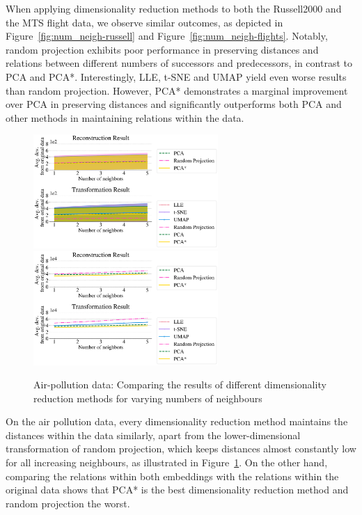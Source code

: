 \documentclass[pdftex,12pt,a4paper]{report}
\begin{document}
When applying dimensionality reduction methods to both the Russell2000 and the MTS flight data, we observe similar outcomes, as depicted in Figure~\ref{fig:num_neigh-russell} and Figure~\ref{fig:num_neigh-flights}.
Notably, random projection exhibits poor performance in preserving distances and relations between different numbers of successors and predecessors, in contrast to PCA and PCA*.
Interestingly, LLE, t-SNE and UMAP yield even worse results than random projection.
However, PCA* demonstrates a marginal improvement over PCA in preserving distances and significantly outperforms both PCA and other methods in maintaining relations within the data.

\begin{figure}
    \includegraphics[width=7cm]{./images/real-world/air_pollution/num_neigh/transformed_1lines_4380points_euclidean.pdf}
    \includegraphics[width=7cm]{./images/real-world/air_pollution/num_neigh/transformed_1lines_4380points_multiple_scalar_product.pdf}
    \caption{Air-pollution data: Comparing the results of different dimensionality reduction methods for varying numbers of neighbours}
    \label{fig:num_neigh-air}
\end{figure}

On the air pollution data, every dimensionality reduction method maintains the distances within the data similarly, apart from the lower-dimensional transformation of random projection, which keeps distances almost constantly low for all increasing neighbours, as illustrated in Figure~\ref{fig:num_neigh-air}.
On the other hand, comparing the relations within both embeddings with the relations within the original data shows that PCA* is the best dimensionality reduction method and random projection the worst.
\end{document}
